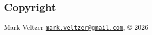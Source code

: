 \documentclass[
]{article}
\begin{document}
\subsection{Copyright}\label{copyright}

Mark Veltzer
\href{mailto:mark.veltzer@gmail.com}{\nolinkurl{mark.veltzer@gmail.com}},
© 2026
\end{document}
